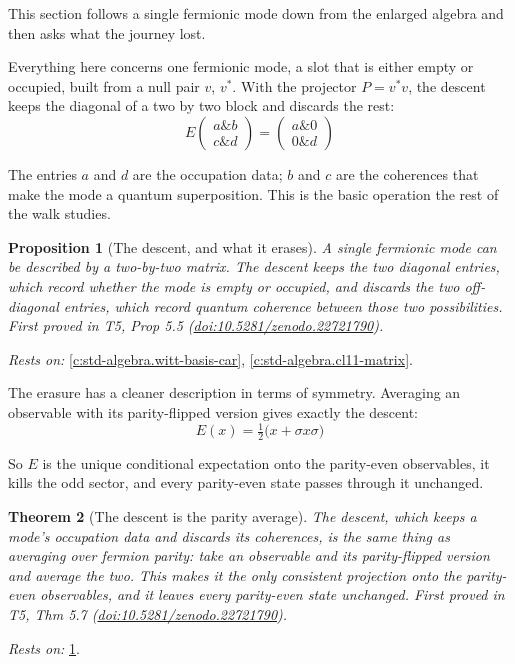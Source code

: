 \documentclass[11pt]{article}
\newtheorem{theorem}{Theorem}[section]
\newtheorem{proposition}[theorem]{Proposition}
\theoremstyle{definition}
\theoremstyle{plain}
\begin{document}
This section follows a single fermionic mode down from the enlarged algebra and then asks what the journey lost.

Everything here concerns one fermionic mode, a slot that is either empty or occupied, built from a null pair $v$, $v^*$. With the projector $P = v^* v$, the descent keeps the diagonal of a two by two block and discards the rest: \[ E\begin{pmatrix} a \& b \\ c \& d \end{pmatrix} = \begin{pmatrix} a \& 0 \\ 0 \& d \end{pmatrix} \]

The entries $a$ and $d$ are the occupation data; $b$ and $c$ are the coherences that make the mode a quantum superposition. This is the basic operation the rest of the walk studies.

\begin{proposition}[The descent, and what it erases]\label{c:singularity.descent-what-it-erases}
A single fermionic mode can be described by a two-by-two matrix. The descent keeps the two diagonal entries, which record whether the mode is empty or occupied, and discards the two off-diagonal entries, which record quantum coherence between those two possibilities.
\emph{First proved in} T5, Prop 5.5 (\href{https://doi.org/10.5281/zenodo.22721790}{doi:10.5281/zenodo.22721790}).
\end{proposition}
\noindent\emph{Rests on:} \ref{c:std-algebra.witt-basis-car}, \ref{c:std-algebra.cl11-matrix}.

The erasure has a cleaner description in terms of symmetry. Averaging an observable with its parity-flipped version gives exactly the descent: \[ E(x) = \tfrac12\bigl(x + \sigma x \sigma\bigr) \]

So $E$ is the unique conditional expectation onto the parity-even observables, it kills the odd sector, and every parity-even state passes through it unchanged.

\begin{theorem}[The descent is the parity average]\label{c:singularity.descent-parity-average}
The descent, which keeps a mode's occupation data and discards its coherences, is the same thing as averaging over fermion parity: take an observable and its parity-flipped version and average the two. This makes it the only consistent projection onto the parity-even observables, and it leaves every parity-even state unchanged.
\emph{First proved in} T5, Thm 5.7 (\href{https://doi.org/10.5281/zenodo.22721790}{doi:10.5281/zenodo.22721790}).
\end{theorem}
\noindent\emph{Rests on:} \ref{c:singularity.descent-what-it-erases}.
\end{document}
